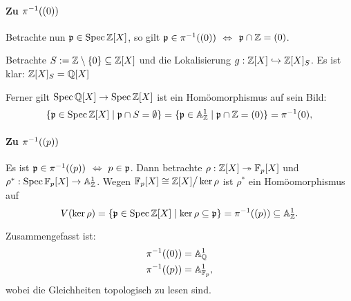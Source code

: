 \paragraph{Zu $\pi^{-1}((0))$}
Betrachte nun $\mathfrak{p} \in \operatorname{Spec} \mathbb{Z}[X]$, so gilt
$\mathfrak{p} \in \pi^{-1}((0))$ $\Leftrightarrow$ $\mathfrak{p} \cap \mathbb{Z} = (0)$.

Betrachte $S:= \mathbb{Z} \setminus \{0\} \subseteq \mathbb{Z}[X]$ und die Lokalisierung
$g: \mathbb{Z}[X] \hookrightarrow \mathbb{Z}[X]_S$. Es ist klar: $\mathbb{Z}[X]_S = \mathbb{Q}[X]$

Ferner gilt $\operatorname{Spec} \mathbb{Q}[X] \to \operatorname{Spec} \mathbb{Z}[X]$ ist ein Homöomorphismus auf sein 
Bild:
\[
	\{\mathfrak{p} \in \operatorname{Spec}\mathbb{Z}[X] \mid \mathfrak{p} \cap S = \emptyset \} = 
	\{\mathfrak{p} \in \mathbb{A}_\mathbb{Z}^1 \mid \mathfrak{p} \cap \mathbb{Z} = (0) \} = \pi^{-1}(0),
\]

\paragraph{Zu $\pi^{-1}((p))$}
Es ist $\mathfrak{p} \in \pi^{-1}((p))$ $\Leftrightarrow$ $p \in \mathfrak{p}$.
Dann betrachte
$\rho: \mathbb{Z}[X] \twoheadrightarrow \mathbb F_p[X]$ und
$\rho^\ast: \operatorname{Spec} \mathbb F_p[X] \to \mathbb{A}_\mathbb{Z}^1$.
Wegen $\mathbb F_p[X] \cong \mathbb{Z}[X] \big/ \ker\rho$ ist $\rho^\ast$ ein Homöomorphismus
auf 
\[
	V(\ker \rho) = \{\mathfrak{p} \in \operatorname{Spec}\mathbb{Z}[X] \mid \ker \rho \subseteq \mathfrak{p}\} = 
	\pi^{-1}((p)) \subseteq \mathbb{A}_\mathbb{Z}^1.
\] 

Zusammengefasst ist:
\begin{align*}
	\pi^{-1}((0)) &= \mathbb{A}_\mathbb{Q}^1\\
	\pi^{-1}((p)) &= \mathbb{A}_{\mathbb F_p}^1,
\end{align*}
wobei die Gleichheiten topologisch zu lesen sind.


